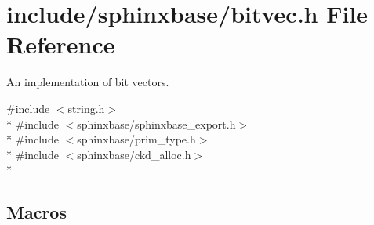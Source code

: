 \section{include/sphinxbase/bitvec.h File Reference}
\label{bitvec_8h}


An implementation of bit vectors.  


{\ttfamily \#include $<$string.\+h$>$}\\*
{\ttfamily \#include $<$sphinxbase/sphinxbase\+\_\+export.\+h$>$}\\*
{\ttfamily \#include $<$sphinxbase/prim\+\_\+type.\+h$>$}\\*
{\ttfamily \#include $<$sphinxbase/ckd\+\_\+alloc.\+h$>$}\\*
\subsection*{Macros}
